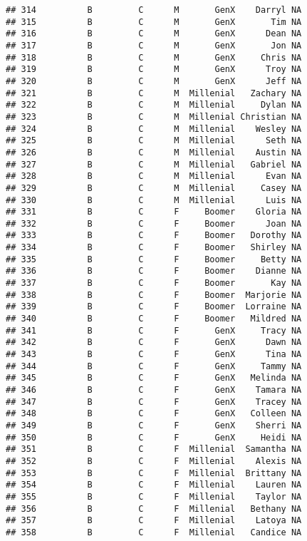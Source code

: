 \documentclass[
]{article}
\begin{document}
\begin{verbatim}
## 314          B         C      M       GenX    Darryl NA
## 315          B         C      M       GenX       Tim NA
## 316          B         C      M       GenX      Dean NA
## 317          B         C      M       GenX       Jon NA
## 318          B         C      M       GenX     Chris NA
## 319          B         C      M       GenX      Troy NA
## 320          B         C      M       GenX      Jeff NA
## 321          B         C      M  Millenial   Zachary NA
## 322          B         C      M  Millenial     Dylan NA
## 323          B         C      M  Millenial Christian NA
## 324          B         C      M  Millenial    Wesley NA
## 325          B         C      M  Millenial      Seth NA
## 326          B         C      M  Millenial    Austin NA
## 327          B         C      M  Millenial   Gabriel NA
## 328          B         C      M  Millenial      Evan NA
## 329          B         C      M  Millenial     Casey NA
## 330          B         C      M  Millenial      Luis NA
## 331          B         C      F     Boomer    Gloria NA
## 332          B         C      F     Boomer      Joan NA
## 333          B         C      F     Boomer   Dorothy NA
## 334          B         C      F     Boomer   Shirley NA
## 335          B         C      F     Boomer     Betty NA
## 336          B         C      F     Boomer    Dianne NA
## 337          B         C      F     Boomer       Kay NA
## 338          B         C      F     Boomer  Marjorie NA
## 339          B         C      F     Boomer  Lorraine NA
## 340          B         C      F     Boomer   Mildred NA
## 341          B         C      F       GenX     Tracy NA
## 342          B         C      F       GenX      Dawn NA
## 343          B         C      F       GenX      Tina NA
## 344          B         C      F       GenX     Tammy NA
## 345          B         C      F       GenX   Melinda NA
## 346          B         C      F       GenX    Tamara NA
## 347          B         C      F       GenX    Tracey NA
## 348          B         C      F       GenX   Colleen NA
## 349          B         C      F       GenX    Sherri NA
## 350          B         C      F       GenX     Heidi NA
## 351          B         C      F  Millenial  Samantha NA
## 352          B         C      F  Millenial    Alexis NA
## 353          B         C      F  Millenial  Brittany NA
## 354          B         C      F  Millenial    Lauren NA
## 355          B         C      F  Millenial    Taylor NA
## 356          B         C      F  Millenial   Bethany NA
## 357          B         C      F  Millenial    Latoya NA
## 358          B         C      F  Millenial   Candice NA

\end{verbatim}
\end{document}
